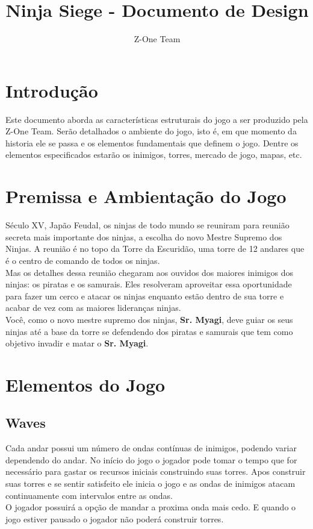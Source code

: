 \documentclass[10pt,a4paper]{article}
\author{Z-One Team}
\title{Ninja Siege - Documento de Design}
\begin{document}
\maketitle 

\tableofcontents

\section{Introdução}
	Este documento aborda as características estruturais do jogo a ser produzido pela Z-One Team. Serão detalhados o ambiente do jogo, isto é, em que momento da historia ele se passa e os elementos fundamentais que definem o jogo. Dentre os elementos especificados estarão os inimigos, torres, mercado de jogo, mapas, etc.\\

\section{Premissa e Ambientação do Jogo}
	Século XV, Japão Feudal, os ninjas de todo mundo se reuniram para reunião secreta mais importante dos ninjas, a escolha do novo Mestre Supremo dos Ninjas. A reunião é no topo da Torre da Escuridão, uma torre de 12 andares que é o centro de comando de todos os ninjas.\\
	Mas os detalhes dessa reunião chegaram aos ouvidos dos maiores inimigos dos ninjas: os piratas e os samurais. Eles resolveram aproveitar essa oportunidade para fazer um cerco e atacar os ninjas enquanto estão dentro de sua torre e acabar de vez com as maiores lideranças ninjas.\\
    Você, como o novo mestre supremo dos ninjas, \textbf{Sr. Myagi}, deve guiar os seus ninjas até a base da torre se defendendo dos piratas e samurais que tem como objetivo invadir e matar o \textbf{Sr. Myagi}.\\

\section{Elementos do Jogo}

\subsection{Waves}
	Cada andar possui um número de ondas contínuas de inimigos, podendo variar dependendo do andar. No início do jogo o jogador pode tomar o tempo que for necessário para gastar os recursos iniciais construindo suas torres. Apos construir suas torres e se sentir satisfeito ele inicia o jogo e as ondas de inimigos atacam continuamente com intervalos entre as ondas.\\
	O jogador possuirá a opção de mandar a proxima onda mais cedo. E quando o jogo estiver pausado o jogador não poderá construir torres.\\
\end{document}
